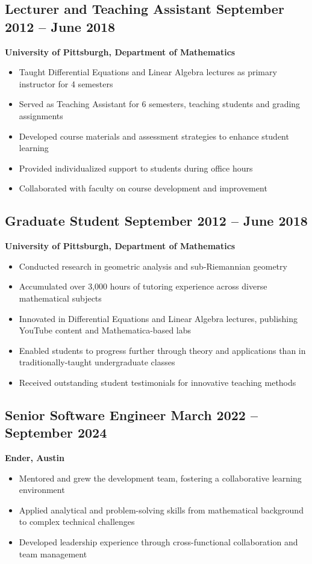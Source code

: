\documentclass[11pt]{article}
\newcommand{\cventry}[3]{
  \subsection[#1]{#1 \hfill #2}
  #3
}
\begin{document}
\cventry{Lecturer and Teaching Assistant}{September 2012 -- June 2018}{
  \textbf{University of Pittsburgh, Department of Mathematics}
  \begin{itemize}[leftmargin=*]
    \item Taught Differential Equations and Linear Algebra lectures as primary instructor for 4 semesters
    \item Served as Teaching Assistant for 6 semesters, teaching students and grading assignments
    \item Developed course materials and assessment strategies to enhance student learning
    \item Provided individualized support to students during office hours
    \item Collaborated with faculty on course development and improvement
  \end{itemize}
}

\cventry{Graduate Student}{September 2012 -- June 2018}{
  \textbf{University of Pittsburgh, Department of Mathematics}
  \begin{itemize}[leftmargin=*]
    \item Conducted research in geometric analysis and sub-Riemannian geometry
    \item Accumulated over 3,000 hours of tutoring experience across diverse mathematical subjects
    \item Innovated in Differential Equations and Linear Algebra lectures, publishing YouTube content and Mathematica-based labs
    \item Enabled students to progress further through theory and applications than in traditionally-taught undergraduate classes
    \item Received outstanding student testimonials for innovative teaching methods
  \end{itemize}
}

\cventry{Senior Software Engineer}{March 2022 -- September 2024}{
  \textbf{Ender, Austin}
  \begin{itemize}[leftmargin=*]
    \item Mentored and grew the development team, fostering a collaborative learning environment
    \item Applied analytical and problem-solving skills from mathematical background to complex technical challenges
    \item Developed leadership experience through cross-functional collaboration and team management
  \end{itemize}
}
\end{document}
